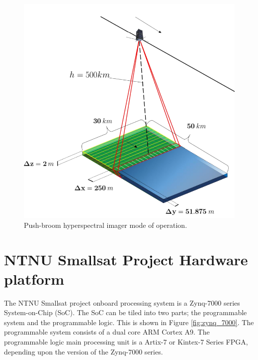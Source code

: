 \begin{figure}[H]
\centering
   \includegraphics[scale=0.36]{images/hyperspectral_imager.PNG}
  \caption{ Push-broom hyperspectral imager mode of operation.  } 
  \label{fig:HSI_functionality}
\end{figure}

\section{NTNU Smallsat Project Hardware platform}
The NTNU Smallsat project onboard processing system is a Zynq-7000 series System-on-Chip (SoC). The SoC can be tiled into two parts; the programmable system and the programmable logic. This is shown in Figure \ref{fig:zynq_7000}. The programmable system consists of a dual core ARM Cortex A9. The programmable logic main processing unit is a Artix-7 or Kintex-7 Series FPGA, depending upon the version of the Zynq-7000 series.


